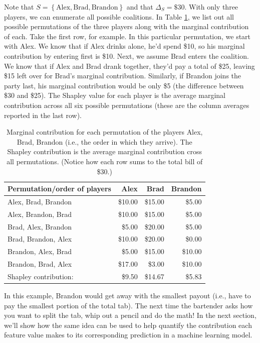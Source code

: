 Note that \(S = \left\{\text{Alex}, \text{Brad}, \text{Brandon}\right\}\) and that \(\Delta_S = \$30\). With only three players, we can enumerate all possible coalitions. In Table \ref{tab:drinks-pdf}, we list out all possible permutations of the three players along with the marginal contribution of each. Take the first row, for example. In this particular permutation, we start with Alex. We know that if Alex drinks alone, he'd spend \$10, so his marginal contribution by entering first is \$10. Next, we assume Brad enters the coalition. We know that if Alex and Brad drank together, they'd pay a total of \$25, leaving \$15 left over for Brad's marginal contribution. Similarly, if Brandon joins the party last, his marginal contribution would be only \$5 (the difference between \$30 and \$25). The Shapley value for each player is the average marginal contribution across all six possible permutations (these are the column averages reported in the last row).

\begin{table}[!htb]

\caption{\label{tab:drinks-pdf}Marginal contribution for each permutation of the players {Alex, Brad, Brandon} (i.e., the order in which they arrive). The Shapley  contribution is the average marginal contribution cross all permutations. (Notice how each row sums to the total bill of \$30.)}
\centering
\begin{tabular}[t]{lrrr}
\toprule
Permutation/order of players & Alex & Brad & Brandon\\
\midrule
Alex, Brad, Brandon & \$10.00 & \$15.00 & \$5.00\\
Alex, Brandon, Brad & \$10.00 & \$15.00 & \$5.00\\
Brad, Alex, Brandon & \$5.00 & \$20.00 & \$5.00\\
Brad, Brandon, Alex & \$10.00 & \$20.00 & \$0.00\\
Brandon, Alex, Brad & \$5.00 & \$15.00 & \$10.00\\
Brandon, Brad, Alex & \$17.00 & \$3.00 & \$10.00\\
\midrule
Shapley contribution: & \$9.50 & \$14.67 & \$5.83\\
\bottomrule
\end{tabular}
\end{table}

In this example, Brandon would get away with the smallest payout (i.e., have to pay the smallest portion of the total tab). The next time the bartender asks how you want to split the tab, whip out a pencil and do the math! In the next section, we'll show how the same idea can be used to help quantify the contribution each feature value makes to its corresponding prediction in a machine learning model.

